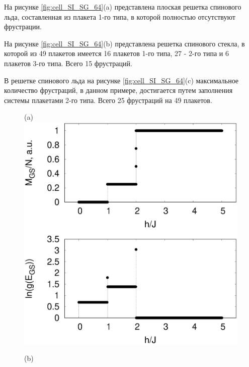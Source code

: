 \documentclass[utf8, babel, sor, jor, amsmath, amssymb, reprint]{elsarticle} %
\begin{document}
На рисунке \ref{fig:cell_SI_SG_64}(a) представлена плоская решетка спинового льда, составленная из плакета 1-го типа, в которой полностью отсутствуют фрустрации. 

На рисунке \ref{fig:cell_SI_SG_64}(b) представлена решетка спинового стекла, в которой из 49 плакетов имеется 16 плакетов 1-го типа, 27 - 2-го типа и 6 плакетов 3-го типа. Всего 15 фрустраций.

В решетке спинового льда на рисунке \ref{fig:cell_SI_SG_64}(c) максимальное количество фрустраций, в данном примере, достигается путем заполнения системы плакетами 2-го типа. Всего 25 фрустраций на 49 плакетов.


\begin{figure}[H]
	\begin{minipage}[h]{0.32\linewidth}
		\centering(a)
		\includegraphics[width=1\linewidth]{pictures/_multiplot_SI64_J0_1}
	\end{minipage}
	\hfill
	\begin{minipage}[h]{0.32\linewidth}
		\centering(b)

\end{minipage}
\end{figure}
\end{document}
